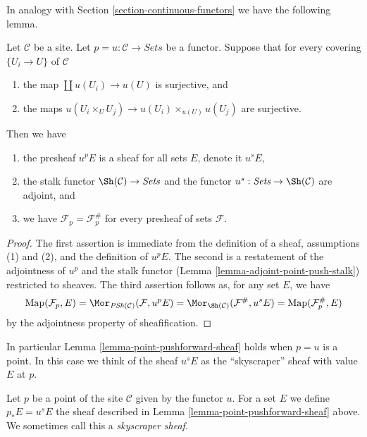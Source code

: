 \noindent
In analogy with Section \ref{section-continuous-functors}
we have the following lemma.

\begin{lemma}
\label{lemma-point-pushforward-sheaf}
Let $\mathcal{C}$ be a site. Let $p = u : \mathcal{C} \to \textit{Sets}$
be a functor. Suppose that for every covering $\{U_i \to U\}$ of $\mathcal{C}$
\begin{enumerate}
\item the map $\coprod u(U_i) \to u(U)$ is surjective, and
\item the maps
$u(U_i \times_U U_j) \to u(U_i) \times_{u(U)} u(U_j)$ are surjective.
\end{enumerate}
Then we have
\begin{enumerate}
\item the presheaf $u^pE$ is a sheaf for all sets $E$, denote it $u^sE$,
\item the stalk functor $\Sh(\mathcal{C}) \to \textit{Sets}$
and the functor $u^s: \textit{Sets} \to \Sh(\mathcal{C})$ are
adjoint, and
\item we have $\mathcal{F}_p = \mathcal{F}^\#_p$
for every presheaf of sets $\mathcal{F}$.
\end{enumerate}
\end{lemma}

\begin{proof}
The first assertion is immediate from the definition of a sheaf, assumptions
(1) and (2), and the definition of $u^pE$. The second is a restatement of the
adjointness of $u^p$ and the stalk functor
(Lemma \ref{lemma-adjoint-point-push-stalk}) restricted to sheaves.
The third assertion follows as, for any set $E$, we have
$$
\text{Map}(\mathcal{F}_p, E) =
\Mor_{\textit{PSh}(\mathcal{C})}(\mathcal{F}, u^pE) =
\Mor_{\Sh(\mathcal{C})}(\mathcal{F}^\#, u^sE) =
\text{Map}(\mathcal{F}^\#_p, E)
$$
by the adjointness property of sheafification.
\end{proof}

\noindent
In particular Lemma \ref{lemma-point-pushforward-sheaf}
holds when $p = u$ is a point. In this case we think of the
sheaf $u^sE$ as the ``skyscraper'' sheaf with value $E$ at $p$.

\begin{definition}
\label{definition-pushforward-point}
Let $p$ be a point of the site $\mathcal{C}$ given by the functor $u$.
For a set $E$ we define $p_*E = u^sE$ the sheaf
described in Lemma \ref{lemma-point-pushforward-sheaf} above.
We sometimes call this a {\it skyscraper sheaf}.
\end{definition}

